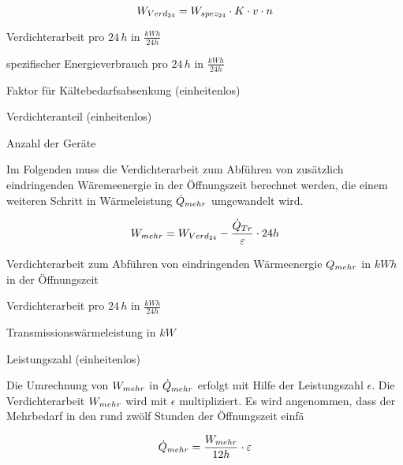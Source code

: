 \begin{equation}
	\lverd = \lspez \cdot K \cdot v \cdot n
\label{lverd}
\end{equation}

\begin{description}[\dth]

	\item[$\lverd$] Verdichterarbeit pro $24\,h$ in $\frac{kWh}{24h}$
	\item[$\lspez$] spezifischer Energieverbrauch pro $24\,h$ in
		$\frac{kWh}{24h}$
	\item[$K$] Faktor für Kältebedarfsabsenkung (einheitenlos)
	\item[$v$] Verdichteranteil (einheitenlos)
	\item[$n$] Anzahl der Geräte

\end{description}
\vspace{0.5cm}

Im Folgenden muss die Verdichterarbeit zum Abf\"uhren von zus\"atzlich
eindringenden W\"aremeenergie in der \"Offnungszeit berechnet werden, die einem
weiteren Schritt in W\"armeleistung $\dot{Q}_{mehr}$ umgewandelt wird.

\begin{equation}
	\lmehr = \lverd - \frac{\ptrans}{\epsilon} \cdot 24h
\label{lmehr}
\end{equation}

\begin{description}[\dth]

	\item[$\lmehr$] Verdichterarbeit zum Abführen von eindringenden
		Wärmeenergie $Q_{mehr}$ in $kWh$ in der \"Offnungszeit
	\item[$\lverd$] Verdichterarbeit pro $24\,h$ in $\frac{kWh}{24h}$
	\item[$\ptrans$] Transmissionswärmeleistung in $kW$
	\item[$\epsilon$] Leistungszahl (einheitenlos)

\end{description}
\vspace{0.5cm}

Die Umrechnung von $\lmehr$ in $\dot{Q}_{mehr}$ erfolgt mit Hilfe der Leistungszahl
$\epsilon$. Die Verdichterarbeit $\lmehr$ wird mit $\epsilon$ multipliziert.
Es wird angenommen, dass der Mehrbedarf in den rund zw\"olf Stunden der
\"Offnungszeit einf\"a

\begin{equation}
	\pmehr = \frac{\lmehr}{12h} \cdot \epsilon
\label{<++>}
\end{equation}

